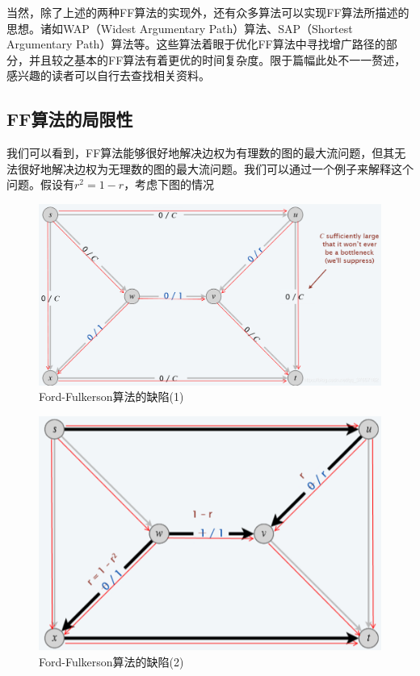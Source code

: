 \par 当然，除了上述的两种FF算法的实现外，还有众多算法可以实现FF算法所描述的思想。诸如WAP（Widest Argumentary Path）算法、SAP（Shortest Argumentary Path）算法等。这些算法着眼于优化FF算法中寻找增广路径的部分，并且较之基本的FF算法有着更优的时间复杂度。限于篇幅此处不一一赘述，感兴趣的读者可以自行去查找相关资料。

\subsection{FF算法的局限性}

\par 我们可以看到，FF算法能够很好地解决边权为有理数的图的最大流问题，但其无法很好地解决边权为无理数的图的最大流问题。我们可以通过一个例子来解释这个问题。假设有$r^2=1-r$，考虑下图的情况

\begin{figure}[hbt]
	\centering
	\includegraphics[scale=0.4]{image/network-flow-backbone1.png}
	\caption{Ford-Fulkerson算法的缺陷(1)}\label{fig:network-flow-backbone1}
\end{figure}

\begin{figure}[hbt]
	\centering
	\includegraphics[scale=0.6]{image/network-flow-backbone2.png}
	\caption{Ford-Fulkerson算法的缺陷(2)}\label{fig:network-flow-backbone2}
\end{figure}

